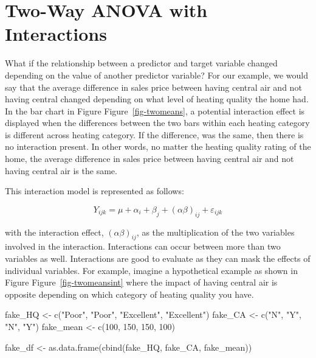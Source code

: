 \documentclass[
  letterpaper,
  DIV=11,
  numbers=noendperiod]{scrreprt}
\newenvironment{Shaded}{\begin{snugshade}}{\end{snugshade}}
\newcommand{\DecValTok}[1]{\textcolor[rgb]{0.68,0.00,0.00}{#1}}
\newcommand{\FunctionTok}[1]{\textcolor[rgb]{0.28,0.35,0.67}{#1}}
\newcommand{\NormalTok}[1]{\textcolor[rgb]{0.00,0.23,0.31}{#1}}
\newcommand{\OtherTok}[1]{\textcolor[rgb]{0.00,0.23,0.31}{#1}}
\newcommand{\StringTok}[1]{\textcolor[rgb]{0.13,0.47,0.30}{#1}}
\begin{document}
\hypertarget{two-way-anova-with-interactions}{%
\section{Two-Way ANOVA with
Interactions}\label{two-way-anova-with-interactions}}

What if the relationship between a predictor and target variable changed
depending on the value of another predictor variable? For our example,
we would say that the average difference in sales price between having
central air and not having central changed depending on what level of
heating quality the home had. In the bar chart in Figure
Figure~\ref{fig-twomeans}, a potential interaction effect is displayed
when the differences between the two bars within each heating category
is different across heating category. If the difference, was the same,
then there is no interaction present. In other words, no matter the
heating quality rating of the home, the average difference in sales
price between having central air and not having central air is the same.

This interaction model is represented as follows:

\[
Y_{ijk} = \mu + \alpha_i + \beta_j + (\alpha \beta)_{ij} + \varepsilon_{ijk}
\]

with the interaction effect, \((\alpha \beta)_{ij}\), as the
multiplication of the two variables involved in the interaction.
Interactions can occur between more than two variables as well.
Interactions are good to evaluate as they can mask the effects of
individual variables. For example, imagine a hypothetical example as
shown in Figure Figure~\ref{fig-twomeansint} where the impact of having
central air is opposite depending on which category of heating quality
you have.

\begin{Shaded}
\begin{Highlighting}[]
\NormalTok{fake\_HQ }\OtherTok{\textless{}{-}} \FunctionTok{c}\NormalTok{(}\StringTok{"Poor"}\NormalTok{, }\StringTok{"Poor"}\NormalTok{, }\StringTok{"Excellent"}\NormalTok{, }\StringTok{"Excellent"}\NormalTok{)}
\NormalTok{fake\_CA }\OtherTok{\textless{}{-}} \FunctionTok{c}\NormalTok{(}\StringTok{"N"}\NormalTok{, }\StringTok{"Y"}\NormalTok{, }\StringTok{"N"}\NormalTok{, }\StringTok{"Y"}\NormalTok{)}
\NormalTok{fake\_mean }\OtherTok{\textless{}{-}} \FunctionTok{c}\NormalTok{(}\DecValTok{100}\NormalTok{, }\DecValTok{150}\NormalTok{, }\DecValTok{150}\NormalTok{, }\DecValTok{100}\NormalTok{)}

\NormalTok{fake\_df }\OtherTok{\textless{}{-}} \FunctionTok{as.data.frame}\NormalTok{(}\FunctionTok{cbind}\NormalTok{(fake\_HQ, fake\_CA, fake\_mean))}
\end{Highlighting}
\end{Shaded}
\end{document}
